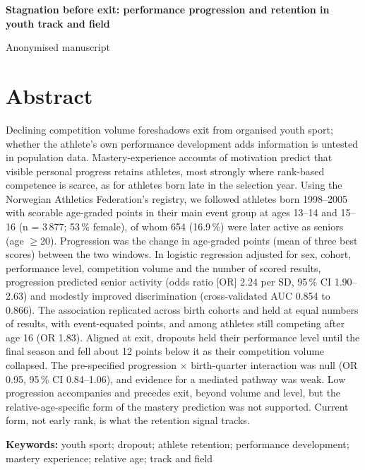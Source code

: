 \documentclass[12pt,a4paper]{article}
\begin{document}
\begin{center}
{\LARGE\bfseries Stagnation before exit: performance progression and retention in youth track and field\par}
\vspace{0.6em}
{\normalsize Anonymised manuscript\par}
\end{center}

\section*{Abstract}

\noindent Declining competition volume foreshadows exit from organised youth sport; whether the athlete's own performance development adds information is untested in population data. Mastery-experience accounts of motivation predict that visible personal progress retains athletes, most strongly where rank-based competence is scarce, as for athletes born late in the selection year. Using the Norwegian Athletics Federation's registry, we followed athletes born 1998--2005 with scorable age-graded points in their main event group at ages 13--14 and 15--16 (n = 3\,877; 53\,\% female), of whom 654 (16.9\,\%) were later active as seniors (age $\geq$20). Progression was the change in age-graded points (mean of three best scores) between the two windows. In logistic regression adjusted for sex, cohort, performance level, competition volume and the number of scored results, progression predicted senior activity (odds ratio [OR] 2.24 per SD, 95\,\% CI 1.90--2.63) and modestly improved discrimination (cross-validated AUC 0.854 to 0.866). The association replicated across birth cohorts and held at equal numbers of results, with event-equated points, and among athletes still competing after age 16 (OR 1.83). Aligned at exit, dropouts held their performance level until the final season and fell about 12 points below it as their competition volume collapsed. The pre-specified progression $\times$ birth-quarter interaction was null (OR 0.95, 95\,\% CI 0.84--1.06), and evidence for a mediated pathway was weak. Low progression accompanies and precedes exit, beyond volume and level, but the relative-age-specific form of the mastery prediction was not supported. Current form, not early rank, is what the retention signal tracks.

\vspace{0.5em}
\noindent\textbf{Keywords:} youth sport; dropout; athlete retention; performance development; mastery experience; relative age; track and field
\end{document}
